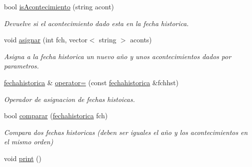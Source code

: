 \begin{DoxyCompactItemize}
bool \hyperlink{classfechahistorica_a8148a79b21542aecb802d3067843a37b}{is\+Acontecimiento} (string acont)
\begin{DoxyCompactList}\small\item\em Devuelve si el acontecimiento dado esta en la fecha historica. \end{DoxyCompactList}\item 
void \hyperlink{classfechahistorica_ae5b96274d1e7f292353cd8dbd8c444ec}{asignar} (int fch, vector$<$ string $>$ aconts)
\begin{DoxyCompactList}\small\item\em Asigna a la fecha historica un nuevo año y unos acontecimientos dados por parametros. \end{DoxyCompactList}\item 
\hyperlink{classfechahistorica}{fechahistorica} \& \hyperlink{classfechahistorica_a292e2b405c55a3dfa1b8365250cc8a6b}{operator=} (const \hyperlink{classfechahistorica}{fechahistorica} \&fchhst)
\begin{DoxyCompactList}\small\item\em Operador de asignacion de fechas histoicas. \end{DoxyCompactList}\item 
bool \hyperlink{classfechahistorica_afdbbcea1e2257b6f6f73b080f310b4e8}{comparar} (\hyperlink{classfechahistorica}{fechahistorica} fch)
\begin{DoxyCompactList}\small\item\em Compara dos fechas historicas (deben ser iguales el año y los acontecimientos en el mismo orden) \end{DoxyCompactList}\item 
void \hyperlink{classfechahistorica_a6abc4af9e3cf18f93460a616b7736efa}{print} ()\hypertarget{classfechahistorica_a6abc4af9e3cf18f93460a616b7736efa}{}\label{classfechahistorica_a6abc4af9e3cf18f93460a616b7736efa}


\end{DoxyCompactItemize}
